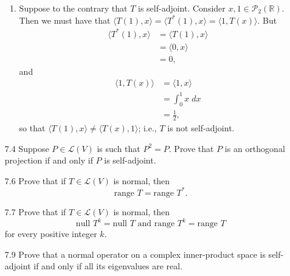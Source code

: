 \documentclass[9pt]{article}
\newcommand{\R}{\mathbb{R}}
\newcommand{\cyc}[1]{\langle #1 \rangle}
\begin{document}
\begin{enumerate}
      \begin{enumerate}
         \item Suppose to the contrary that $T$ is self-adjoint. Consider
               $x, 1 \in \mathcal{P}_2(\R)$. Then we must have that
               $\cyc{T(1), x} = \cyc{T^*(1), x} = \cyc{1, T(x)}$. But
               \begin{align*}
                  \cyc{T^*(1), x} &= \cyc{T(1), x} \\
                                 &= \cyc{0, x} \\
                                 &= 0,
               \end{align*}
               and
               \begin{align*}
                  \cyc{1, T(x)} &= \cyc{1, x} \\
                                &= \int_0^1 x\;dx \\
                                &= \frac{1}{2},
               \end{align*}
               so that $\cyc{T(1), x} \neq  \cyc{T(x), 1}$; i.e., $T$ is not
               self-adjoint.
      \end{enumerate}
   \item[7.4]  Suppose $P \in \mathcal{L}(V)$ is such that $P^2 = P$. Prove that
               $P$ is an orthogonal projection if and only if $P$ is
               self-adjoint.
   \item[7.6]  Prove that if $T \in \mathcal{L}(V)$ is normal, then
               $$\text{range } T = \text{range } T^*.$$
   \item[7.7]  Prove that if $T \in \mathcal{L}(V)$ is normal, then
               $$\text{null } T^k = \text{null } T \text{ and }
                 \text{range }T^k = \text{range }T$$
               for every positive integer $k$.
   \item[7.9]  Prove that a normal operator on a complex inner-product space is
               self-adjoint if and only if all its eigenvalues are real.
\end{enumerate}
\end{document}
